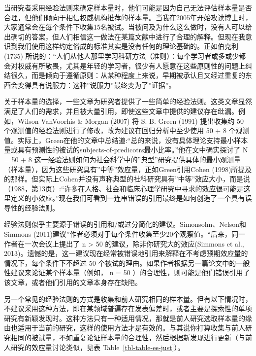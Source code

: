 \documentclass[
  letterpaper,
  DIV=11,
  numbers=noendperiod]{scrreprt}
\begin{document}
当研究者采用经验法则来确定样本量时，他们可能是因为自己无法评估样本量是否合理，但他们倾向于相信权威机构推荐的样本量。当我在2005年开始攻读博士时，大家通常会在每个条件下收集15名被试。当被问及为什么这么做时，没有人可以给出确切的答案，但人们相信这一做法在某篇文献中进行了合理的解释。但现在我意识到我们使用这样约定俗成的标准其实是没有任何的理论基础的。正如伯克利
(1735)
所说的：``人们从他人那里学习科研方法（准则）：每个学习者或多或少都会对权威有所敬畏，尤其是年轻的学习者，很少有人愿意在这些原则性的问题上纠结很久，而是倾向于遵循原则：从某种程度上来说，早期被承认且又经过重复的东西会变得具有说服力：这种''说服力''最终变为了''证据''。

关于样本量的选择，一些文章为研究者提供了一些简单的经验法则。这类文章显然满足了人们的需求，并且被大量引用，即使这些文章中提供的建议存在纰漏。例如，Wilson
VanVoorhis \& Morgan (2007) 将 S. B. Green (1991) 提出收集约 50
个观测值的经验法则进行了修改，改为建议在回归分析中至少使用 50 + 8
个观测值。实际上，Green在他的文章中总结道:``总的来说，没有具体理论支持最小样本量或具有预测性的被试的subjects-of-predicotrs最小比率。''他在文中确实探讨了
N = 50 + 8
这一经验法则如何为社会科学中的''典型''研究提供具体的最小观测量（样本量），因为这些研究具有''中等''效应量，正如Green引用Cohen
(1998)所提及的那样。但实际上Cohen并没有声称典型的社科研究具有''中等''效应大小，而是说（1988，第13页）:``许多在人格、社会和临床心理学研究中寻求的效应很可能是这里定义的小效应。''现在我们可看到一连串错误的引用最终是如何创造了一个具有误导性的经验法则。

经验法则似乎主要源于错误的引用和/或过分简化的建议。Simonsohn、Nelson和Simmons
(2011)建议''作者必须对于每个条件收集至少20个观察值。``后来，同一作者在一次会议上提出了
n \textgreater{} 50 的建议，除非你研究大的效应(Simmons et al.,
2013)。遗憾的是，这一建议现在经常被错误地引用来解释在不考虑预期效应量的情况下，每个条件下不超过
50
个被试的理由。如果作者根据另一篇论文中的一般性建议来论证某个样本量（例如，
n = 50
）的合理性，则可能是他们错误引用了该文章，或者他们引用的文章本身存在缺陷。

另一个常见的经验法则的方式是收集和前人研究相同的样本量。但有以下情况时，不建议采用这种方法，即在某领域普遍存在发表偏差时，或者主要是探索性的单项研究有新颖发现时。这种方法只有一种适用情况，那就是前人研究选取样本量的缘由也适用于当前的研究，这样的使用方法才是有效的。与其说你打算收集与前人研究相同的被试量，不如重复论证样本量的合理性，然后根据新发现进行更新（与前人研究的效应量讨论类似，见表
Table~\ref{tbl-table-es-just}）。
\end{document}

